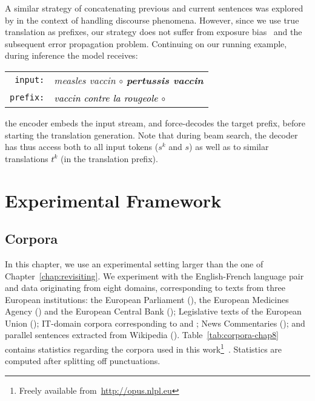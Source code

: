 A similar strategy of concatenating previous and current sentences was explored by \citet{tiedemann17neural} in the context of handling discourse phenomena.
However, since we use true translation as prefixes, our strategy does not suffer from exposure bias~\cite{Ranzato15sequence} and the subsequent error propagation problem.
%
Continuing on our running example, during inference the model receives:
\begin{center}
\begin{tabular}{rl}
\texttt{input:} & \it measles vaccin $\circ$ {\bf pertussis vaccin} \\ 
\texttt{prefix:} & \it \textcolor{black}{vaccin contre la rougeole $\circ$} \\
\end{tabular}
\end{center}
\noindent the encoder embeds the input stream, and force-decodes the target prefix,  before starting the translation generation. Note that during beam search, the decoder has thus access both to all input tokens ($s^k$ and $s$) as well as to similar translations \textcolor{black}{$t^k$} (in the translation prefix). 
\section{Experimental Framework}
\label{sec:eperiments-chap8}

\subsection{Corpora}
\label{ssec:corpora-chap8}
In this chapter, we use an experimental setting larger than the one of Chapter~\ref{chap:revisiting}. We experiment with the English-French language pair and data originating from eight domains, corresponding to texts from three European institutions: 
the European Parliament (), 
the European Medicines Agency () and
the European Central Bank ();
Legislative texts of the European Union ();
IT-domain corpora corresponding to  and ;
News Commentaries ();
and parallel sentences extracted from Wikipedia ().
%
Table~\ref{tab:corpora-chap8} contains statistics regarding the corpora used in this work\footnote{Freely available from~\url{http://opus.nlpl.eu}}~\citep{Tiedemann12parallel}. Statistics are computed after splitting off punctuations.

